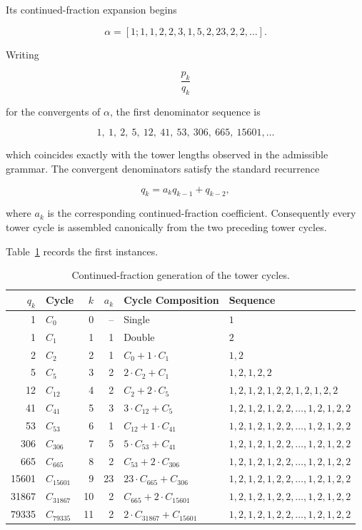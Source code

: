 \documentclass[12pt, oneside]{article}
\numberwithin{equation}{section}
\theoremstyle{definition}
\theoremstyle{plain}
\theoremstyle{remark}
\begin{document}
Its continued-fraction expansion begins

\[
\alpha=[1;1,1,2,2,3,1,5,2,23,2,2,\dots].
\]

Writing

\[
\frac{p_k}{q_k}
\]

for the convergents of $\alpha$, the first denominator sequence is

\[
1,\ 1,\ 2,\ 5,\ 12,\ 41,\ 53,\ 306,\ 665,\ 15601,\ldots
\]

which coincides exactly with the tower lengths observed in the admissible grammar.
The convergent denominators satisfy the standard recurrence

\[
q_k=a_k q_{k-1}+q_{k-2},
\]

where $a_k$ is the corresponding continued-fraction coefficient.
Consequently every tower cycle is assembled canonically from the two
preceding tower cycles.

Table~\ref{tab:tower-cycles} records the first instances.

\begin{table}[ht]
\centering
\caption{Continued-fraction generation of the tower cycles.}
\label{tab:tower-cycles}
\begin{tabular}{r l r r l l}
\hline
$q_k$ & Cycle & $k$ & $a_k$ & Cycle Composition & Sequence \\
\hline
1     & $C_{    0}$ &  0 & -- & Single                          & $1$ \\
1     & $C_{    1}$ &  1 &  1 & Double                          & $2$ \\
2     & $C_{    2}$ &  2 &  1 & $C_{    0} + 1 \cdot C_{    1}$ & $1,2$ \\
5     & $C_{    5}$ &  3 &  2 & $2 \cdot C_{    2} + C_{    1}$ & $1,2,1,2,2$ \\
12    & $C_{   12}$ &  4 &  2 & $C_{    2} + 2 \cdot C_{    5}$ & $1,2,1,2,1,2,2,1,2,1,2,2$ \\
41    & $C_{   41}$ &  5 &  3 & $3 \cdot C_{   12} + C_{    5}$ & $1,2,1,2,1,2,2,\ldots,1,2,1,2,2$  \\
53    & $C_{   53}$ &  6 &  1 & $C_{   12} + 1 \cdot C_{   41}$ & $1,2,1,2,1,2,2,\ldots,1,2,1,2,2$  \\
306   & $C_{  306}$ &  7 &  5 & $5 \cdot C_{   53} + C_{   41}$ & $1,2,1,2,1,2,2,\ldots,1,2,1,2,2$  \\
665   & $C_{  665}$ &  8 &  2 & $C_{   53} + 2 \cdot C_{  306}$ & $1,2,1,2,1,2,2,\ldots,1,2,1,2,2$  \\
15601 & $C_{15601}$ &  9 & 23 & $23 \cdot C_{665} + C_{   306}$ & $1,2,1,2,1,2,2,\ldots,1,2,1,2,2$  \\
31867 & $C_{31867}$ & 10 &  2 & $C_{  665} + 2 \cdot C_{15601}$ & $1,2,1,2,1,2,2,\ldots,1,2,1,2,2$  \\
79335 & $C_{79335}$ & 11 &  2 & $2 \cdot C_{31867} + C_{15601}$ & $1,2,1,2,1,2,2,\ldots,1,2,1,2,2$  \\
\hline
\end{tabular}
\end{table}
\end{document}
